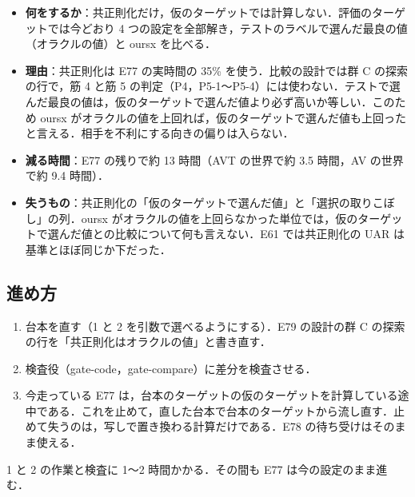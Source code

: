 \begin{itemize}
\item \textbf{何をするか}：共正則化だけ，仮のターゲットでは計算しない．評価のターゲットでは今どおり 4 つの設定を全部解き，テストのラベルで選んだ最良の値（オラクルの値）と oursx を比べる．
\item \textbf{理由}：共正則化は E77 の実時間の 35\% を使う．比較の設計では群 C の探索の行で，筋 4 と筋 5 の判定（P4，P5-1〜P5-4）には使わない．テストで選んだ最良の値は，仮のターゲットで選んだ値より必ず高いか等しい．このため oursx がオラクルの値を上回れば，仮のターゲットで選んだ値も上回ったと言える．相手を不利にする向きの偏りは入らない．
\item \textbf{減る時間}：E77 の残りで約 13 時間（AVT の世界で約 3.5 時間，AV の世界で約 9.4 時間）．
\item \textbf{失うもの}：共正則化の「仮のターゲットで選んだ値」と「選択の取りこぼし」の列．oursx がオラクルの値を上回らなかった単位では，仮のターゲットで選んだ値との比較について何も言えない．E61 では共正則化の UAR は基準とほぼ同じか下だった．
\end{itemize}

\subsection{進め方}

\begin{enumerate}
\item 台本を直す（1 と 2 を引数で選べるようにする）．E79 の設計の群 C の探索の行を「共正則化はオラクルの値」と書き直す．
\item 検査役（gate-code，gate-compare）に差分を検査させる．
\item 今走っている E77 は，台本のターゲットの仮のターゲットを計算している途中である．これを止めて，直した台本で台本のターゲットから流し直す．止めて失うのは，写しで置き換わる計算だけである．E78 の待ち受けはそのまま使える．
\end{enumerate}

1 と 2 の作業と検査に 1〜2 時間かかる．その間も E77 は今の設定のまま進む．
